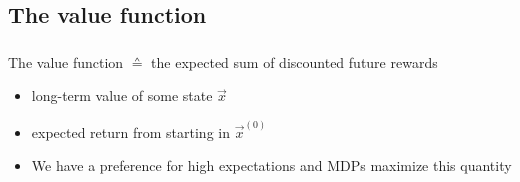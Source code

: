 \subsection{The value function}



\begin{frame}\frametitle{\subsecname}

The value function $\corresponds$ the expected sum of discounted future rewards


\begin{itemize}
\item long-term value of some state $\vec x$
\item expected return from starting in $\vec x^{(0)}$
\item We have a preference for high expectations and MDPs maximize this quantity
\end{itemize}

\end{frame}

